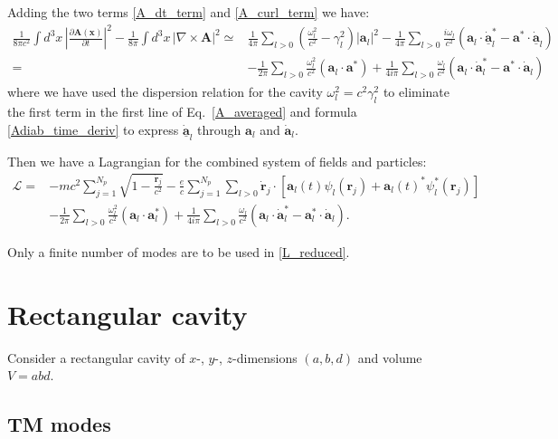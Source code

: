 \documentclass[11pt]{article}
\newcommand{\LL}{\mathcal{L}}
\begin{document}
Adding the two terms \eqref{A_dt_term} and \eqref{A_curl_term} we have:
%
\begin{align}
\frac{1}{8\pi c^2}\int \!\!d^3 x\,\left|\frac{\partial \mathbf{A}(\mathbf{x})}{\partial t}\right|^2
-\frac{1}{8\pi} \int \!\!d^3 x\,\left| \nabla\times \mathbf{A} \right|^2 \simeq& 
\frac{1}{4\pi}\sum_{l>0}\left( \frac{\omega_l^2}{c^2} - \gamma_l^2 \right) |\mathbf{a}_l|^2
-\frac{1}{4\pi}\sum_{l>0}\frac{i\omega_l}{c^2}\left(  \mathbf{a}_l\cdot\underline{\dot{\mathbf{a}}}_l^* - \mathbf{a}^*\cdot\underline{\dot{\mathbf{a}}}_l  \right) \nonumber\\
=& -\frac{1}{2\pi} \sum_{l>0}\frac{\omega_l^2}{c^2}\left( \mathbf{a}_l\cdot\mathbf{a}^*\right) 
+ \frac{1}{4i\pi}\sum_{l>0}\frac{\omega_l}{c^2}\left(  \mathbf{a}_l\cdot{\dot{\mathbf{a}}}_l^* - \mathbf{a}^*\cdot{\dot{\mathbf{a}}}_l \right)
\label{A_averaged}
\end{align}
%
where we have used the dispersion relation for the cavity $\omega_l^2 = c^2\gamma_l^2$ 
to eliminate the first term in the first line of Eq.~\eqref{A_averaged} and formula \eqref{Adiab_time_deriv} 
to express $\underline{\dot{\mathbf{a}}}_l$ through $\mathbf{a}_l$ and ${\dot{\mathbf{a}}}_l$.

Then we have a Lagrangian for the combined system of fields and particles:
%
\begin{align}
\LL =&  -mc^2\sum_{j=1}^{N_p}\sqrt{1-\frac{\dot{\mathbf{r}}_j} {c^2}} 
-\frac{e}{c}\sum_{j=1}^{N_p}\sum_{l>0}\dot{\mathbf{r}}_j \cdot 
\left[ \mathbf{a}_l(t)\psi_l(\mathbf{r}_j) + \mathbf{a}_l(t)^*\psi_l^*(\mathbf{r}_j) \right] \nonumber\\
& - \frac{1}{2\pi} \sum_{l>0}\frac{\omega_l^2}{c^2}\left( \mathbf{a}_l\cdot\mathbf{a}_l^*\right) 
+ \frac{1}{4i\pi}\sum_{l>0}\frac{\omega_l}{c^2}\left(  \mathbf{a}_l\cdot{\dot{\mathbf{a}}}_l^* - \mathbf{a}_l^*\cdot{\dot{\mathbf{a}}}_l \right).
\label{L_reduced}
\end{align}
%

Only a finite number of modes are to be used in \eqref{L_reduced}.

\section{Rectangular cavity}
\label{Rectangular cavity}

Consider a rectangular cavity of $x$-, $y$-, $z$-dimensions $(a,b,d)$ and volume $V=abd$.

\subsection{TM modes}
\label{TM_rectangular_modes}
\end{document}
